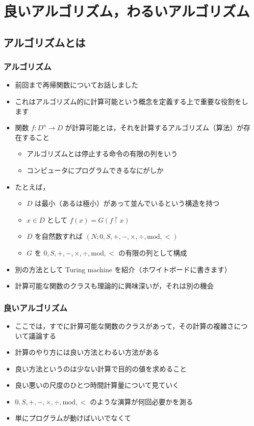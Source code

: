 \section{良いアルゴリズム，わるいアルゴリズム}
\subsection{アルゴリズムとは}
\begin{frame}
\frametitle{アルゴリズム}
  \begin{itemize}
\item 前回まで再帰関数についてお話しました
\item これはアルゴリズム的に計算可能という概念を定義する上で重要な役割をします
\item 関数 \(f:D^n\rightarrow D\) が計算可能とは，それを計算するアルゴリズム（算法）が存在すること
    \begin{itemize}
\item アルゴリズムとは停止する命令の有限の列をいう
\item コンピュータにプログラムできるなにがしか
    \end{itemize}
\item たとえば，
    \begin{itemize}
\item $D$ は最小（あるは極小）があって並んでいるという構造を持つ
\item \(x\in D\) として \(f(x)=G(f\upharpoonright x)\)
\item $D$ を自然数すれば \((N;0,S,+,-,\times,\div,\mathrm{mod},<)\)
\item $G$ を \(0,S,+,-,\times,\div,\mathrm{mod},<\) の有限の列として構成
    \end{itemize}
\item 別の方法として Turing machine を紹介（ホワイトボードに書きます）
\item 計算可能な関数のクラスも理論的に興味深いが，それは別の機会
  \end{itemize}
\end{frame}
\begin{frame}
\frametitle{良いアルゴリズム}
  \begin{itemize}
\item ここでは，すでに計算可能な関数のクラスがあって，その計算の複雑さについて議論する
\item 計算のやり方には良い方法とわるい方法がある
\item 良い方法というのは少ない計算で目的の値を求めること
\item 良い悪いの尺度のひとつ時間計算量について見ていく
\item \(0,S,+,-,\times,\div,\mathrm{mod},<\) のような演算が何回必要かを測る
\item 単にプログラムが動けばいいでなくて
  \end{itemize}
\end{frame}
